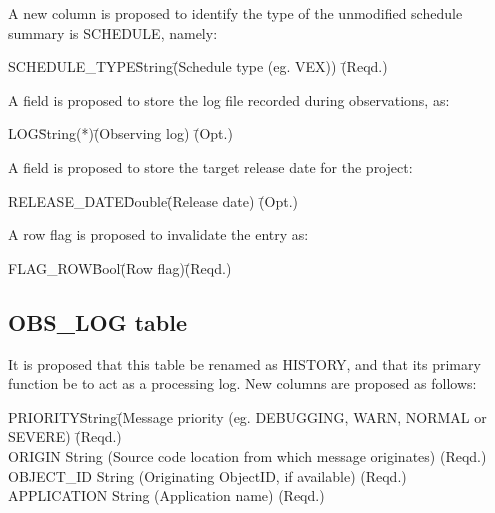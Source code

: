 \documentclass{article}
\begin{document}
\begin{itemize}
A new column is proposed to identify the type of the unmodified
schedule summary is SCHEDULE, namely:

\begin{tabbing} 
SCHEDULE\_TYPE\quad\quad \= String\quad\quad \= 
(Schedule type (eg. VEX)) \quad\quad \= (Reqd.) \\
\end{tabbing}

A field is proposed to store the log file recorded during observations, as:

\begin{tabbing}
LOG\quad\quad \= String(*)\quad\quad \= (Observing log)
 \quad\quad \= (Opt.) \\
\end{tabbing}

A field is proposed to store the target release date for the project:

\begin{tabbing}
RELEASE\_DATE\quad\quad \= Double\quad\quad \= (Release date)
 \quad\quad \= (Opt.) \\
\end{tabbing}

A row flag is proposed to invalidate the entry as:

\begin{tabbing}
FLAG\_ROW\quad\quad \= Bool\quad\quad \= (Row flag)\quad\quad \= (Reqd.)\\
\end{tabbing}

\subsection{OBS\_LOG table}

It is proposed that this table be renamed as HISTORY, and that its
primary function be to act as a processing log. New columns
are proposed as follows:

\begin{tabbing}
PRIORITY\quad\quad\quad \= String\quad\quad \= 
(Message priority (eg. DEBUGGING, WARN, NORMAL or SEVERE)
 \quad\quad \= (Reqd.) \\
ORIGIN             \> String  \> 
(Source code location from which message originates) \> (Reqd.) \\
OBJECT\_ID         \> String  \>
(Originating ObjectID, if available) \> (Reqd.) \\
APPLICATION        \> String \>
(Application name) \> (Reqd.) \\
\end{tabbing}


\end{itemize}
\end{document}
